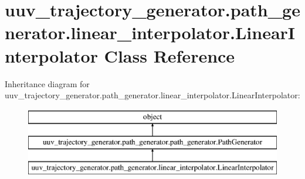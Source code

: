 \hypertarget{classuuv__trajectory__generator_1_1path__generator_1_1linear__interpolator_1_1LinearInterpolator}{}\section{uuv\+\_\+trajectory\+\_\+generator.\+path\+\_\+generator.\+linear\+\_\+interpolator.\+Linear\+Interpolator Class Reference}
\label{classuuv__trajectory__generator_1_1path__generator_1_1linear__interpolator_1_1LinearInterpolator}
Inheritance diagram for uuv\+\_\+trajectory\+\_\+generator.\+path\+\_\+generator.\+linear\+\_\+interpolator.\+Linear\+Interpolator\+:\begin{figure}[H]
\begin{center}
\leavevmode
\includegraphics[height=3.000000cm]{classuuv__trajectory__generator_1_1path__generator_1_1linear__interpolator_1_1LinearInterpolator}
\end{center}
\end{figure}
